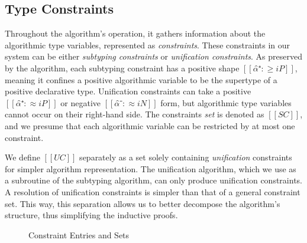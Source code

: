\subsection{Type Constraints}
Throughout the algorithm's operation, it gathers information about the
algorithmic type variables, represented as \emph{constraints}. These constraints
in our system can be either \emph{subtyping constraints} or \emph{unification
constraints}. As preserved by the algorithm, each subtyping constraint has a
positive shape $[[α̂⁺ :≥ iP]]$, meaning it confines a positive algorithmic
variable to be the supertype of a positive declarative type. Unification
constraints can take a positive $[[α̂⁺ :≈ iP]]$ or negative $[[α̂⁻ :≈ iN]]$
form, but algorithmic type variables cannot occur on their right-hand side. The
constraints \emph{set} is denoted as $[[SC]]$, and we presume that each
algorithmic variable can be restricted by at most one constraint.

We define $[[UC]]$ separately as a set solely containing \emph{unification}
constraints for simpler algorithm representation. The unification algorithm,
which we use as a subroutine of the subtyping algorithm, can only produce
unification constraints. A resolution of unification constraints is simpler than
that of a general constraint set. This way, this separation allows us to better
decompose the algorithm's structure, thus simplifying the inductive proofs.

  \begin{figure}[h]
    \begin{multicols}{2}

    \columnbreak

    \end{multicols}

    \label{fig:syntax-e-sc}
    \caption{Constraint Entries and Sets}
  \end{figure}


